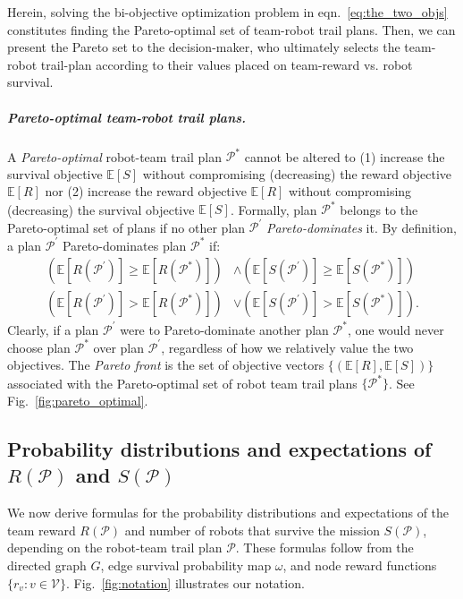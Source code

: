 \documentclass[11pt, oneside]{article}
\begin{document}
Herein, solving the bi-objective optimization problem in eqn.~\ref{eq:the_two_objs} constitutes finding the Pareto-optimal set of team-robot trail plans. Then, we can present the Pareto set to the decision-maker, who ultimately selects the team-robot trail-plan according to their values placed on team-reward vs. robot survival. 

\subparagraph{Pareto-optimal team-robot trail plans.} 
A \emph{Pareto-optimal} \cite{pardalos2017non} robot-team trail plan $\mathcal{P}^*$ cannot be altered to
(1) increase the survival objective $\mathbb{E}[S]$ without compromising (decreasing) the reward objective $\mathbb{E}[R]$
nor
(2) increase the reward objective $\mathbb{E}[R]$ without compromising (decreasing) the survival objective $\mathbb{E}[S]$.
Formally, plan $\mathcal{P}^*$ belongs to the Pareto-optimal set of plans if no other plan $\mathcal{P}^\prime$ \emph{Pareto-dominates} it. By definition, a plan $\mathcal{P}^\prime$ Pareto-dominates plan $\mathcal{P}^*$ if:
\begin{align}
	\left (\mathbb{E}[R(\mathcal{P}^\prime)] \geq \mathbb{E}[R(\mathcal{P}^*)]  \right) & \wedge \left( \mathbb{E}[S(\mathcal{P}^\prime)] \geq \mathbb{E}[S(\mathcal{P}^*)] \right) \\
	\left( \mathbb{E}[R(\mathcal{P}^\prime)] > \mathbb{E}[R(\mathcal{P}^*)] \right) & \vee \left( \mathbb{E}[S(\mathcal{P}^\prime)] > \mathbb{E}[S(\mathcal{P}^*)] \right).
\end{align}
Clearly, if a plan $\mathcal{P}^\prime$ were to Pareto-dominate another plan $\mathcal{P}^*$, one would never choose plan $\mathcal{P}^*$ over plan $\mathcal{P}^\prime$, regardless of how we relatively value the two objectives. The \emph{Pareto front} is the set of objective vectors $\{(\mathbb{E}[R], \mathbb{E}[S])\}$ associated with the Pareto-optimal set of robot team trail plans $\{\mathcal{P}^*\}$. See Fig.~\ref{fig:pareto_optimal}. 

\subsection{Probability distributions and expectations of $R(\mathcal{P})$ and $S(\mathcal{P})$}
We now derive formulas for the probability distributions and expectations of the team reward $R(\mathcal{P})$ and number of robots that survive the mission $S(\mathcal{P})$, depending on the robot-team trail plan $\mathcal{P}$. 
These formulas follow from the directed graph $G$, edge survival probability map $\omega$, and node reward functions $\{r_v : v \in \mathcal{V}\}$. Fig.~\ref{fig:notation} illustrates our notation.
\end{document}
